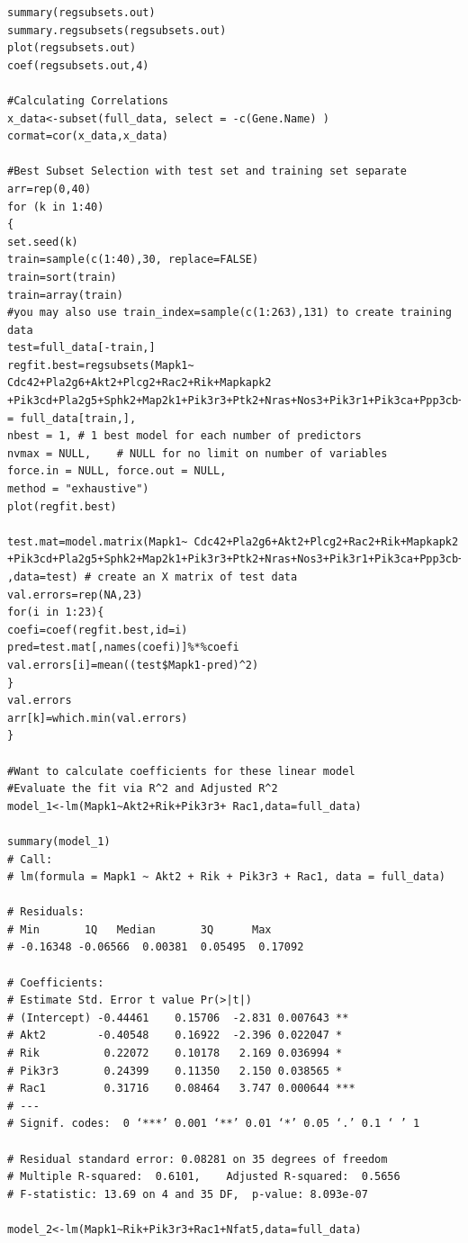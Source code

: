 \documentclass{article}
\begin{document}
\begin{lstlisting}[frame=single,style=base]
summary(regsubsets.out)
summary.regsubsets(regsubsets.out)
plot(regsubsets.out)
coef(regsubsets.out,4)

#Calculating Correlations
x_data<-subset(full_data, select = -c(Gene.Name) )
cormat=cor(x_data,x_data)

#Best Subset Selection with test set and training set separate
arr=rep(0,40)
for (k in 1:40)
{
set.seed(k)
train=sample(c(1:40),30, replace=FALSE)
train=sort(train)
train=array(train)
#you may also use train_index=sample(c(1:263),131) to create training data
test=full_data[-train,]
regfit.best=regsubsets(Mapk1~ Cdc42+Pla2g6+Akt2+Plcg2+Rac2+Rik+Mapkapk2 +Pik3cd+Pla2g5+Sphk2+Map2k1+Pik3r3+Ptk2+Nras+Nos3+Pik3r1+Pik3ca+Ppp3cb+Map2k2+Nfatc4+Mapk13+Rac1+Nfat5,data = full_data[train,], 
nbest = 1, # 1 best model for each number of predictors
nvmax = NULL,    # NULL for no limit on number of variables
force.in = NULL, force.out = NULL,
method = "exhaustive")
plot(regfit.best)

test.mat=model.matrix(Mapk1~ Cdc42+Pla2g6+Akt2+Plcg2+Rac2+Rik+Mapkapk2 +Pik3cd+Pla2g5+Sphk2+Map2k1+Pik3r3+Ptk2+Nras+Nos3+Pik3r1+Pik3ca+Ppp3cb+Map2k2+Nfatc4+Mapk13+Rac1+Nfat5 ,data=test) # create an X matrix of test data
val.errors=rep(NA,23)
for(i in 1:23){
coefi=coef(regfit.best,id=i)
pred=test.mat[,names(coefi)]%*%coefi
val.errors[i]=mean((test$Mapk1-pred)^2)
}
val.errors
arr[k]=which.min(val.errors)
}

#Want to calculate coefficients for these linear model  
#Evaluate the fit via R^2 and Adjusted R^2
model_1<-lm(Mapk1~Akt2+Rik+Pik3r3+ Rac1,data=full_data)

summary(model_1)
# Call:
# lm(formula = Mapk1 ~ Akt2 + Rik + Pik3r3 + Rac1, data = full_data)

# Residuals:
# Min       1Q   Median       3Q      Max 
# -0.16348 -0.06566  0.00381  0.05495  0.17092 

# Coefficients:
# Estimate Std. Error t value Pr(>|t|)    
# (Intercept) -0.44461    0.15706  -2.831 0.007643 ** 
# Akt2        -0.40548    0.16922  -2.396 0.022047 *  
# Rik          0.22072    0.10178   2.169 0.036994 *  
# Pik3r3       0.24399    0.11350   2.150 0.038565 *  
# Rac1         0.31716    0.08464   3.747 0.000644 ***
# ---
# Signif. codes:  0 ‘***’ 0.001 ‘**’ 0.01 ‘*’ 0.05 ‘.’ 0.1 ‘ ’ 1

# Residual standard error: 0.08281 on 35 degrees of freedom
# Multiple R-squared:  0.6101,    Adjusted R-squared:  0.5656 
# F-statistic: 13.69 on 4 and 35 DF,  p-value: 8.093e-07

model_2<-lm(Mapk1~Rik+Pik3r3+Rac1+Nfat5,data=full_data)


\end{lstlisting}
\end{document}
